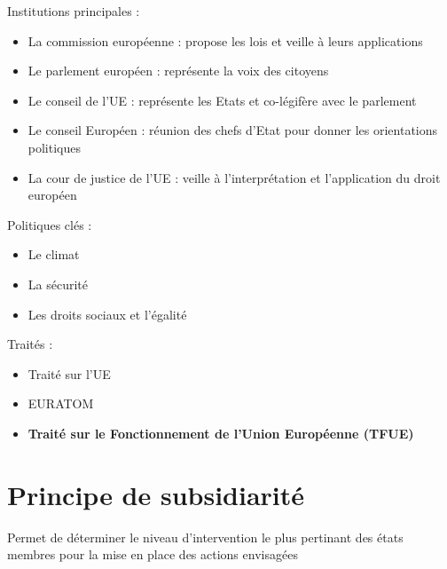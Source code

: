 Institutions principales : 
\begin{itemize}
    \item La commission européenne : propose les lois et veille à leurs applications
    \item Le parlement européen : représente la voix des citoyens
    \item Le conseil de l'UE : représente les Etats et co-légifère avec le parlement
    \item Le conseil Européen : réunion des chefs d'Etat pour donner les orientations politiques
    \item La cour de justice de l'UE : veille à l'interprétation et l'application du droit européen \newline
\end{itemize}

\newpage
Politiques clés :
\begin{itemize}
    \item Le climat
    \item La sécurité
    \item Les droits sociaux et l'égalité \newline
\end{itemize}

Traités :
\begin{itemize}
    \item Traité sur l'UE
    \item EURATOM
    \item \textbf{Traité sur le Fonctionnement de l'Union Européenne (TFUE)} \newline
\end{itemize}
\newpage
\section{Principe de subsidiarité}
Permet de déterminer le niveau d'intervention le plus pertinant des états membres pour la mise en place des actions envisagées
\newline
